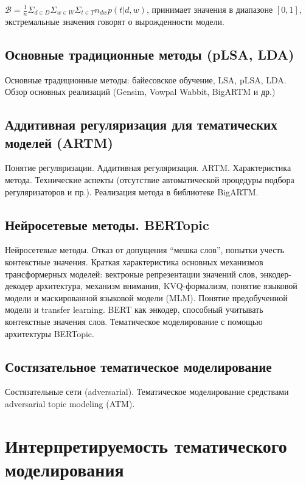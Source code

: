 $\mathcal{B} = \frac{1}{n}\Sigma_{d \in D}\Sigma_{w \in W}\Sigma_{t \in T}n_{dw}p(t|d,w)$, принимает значения в диапазоне $[0, 1]$, экстремальные значения говорят о вырожденности модели.


\section{Основные традиционные методы (pLSA, LDA)}

Основные традиционные методы: байесовское обучение, LSA, pLSA, LDA. Обзор основных реализаций (Gensim, Vowpal Wabbit, BigARTM и др.)

\section{Аддитивная регуляризация для тематических моделей (ARTM)}

Понятие регуляризации. Аддитивная регуляризация. ARTM. Характеристика метода. Технические аспекты (отсутствие автоматической процедуры подбора регуляризаторов и пр.). Реализация метода в библиотеке BigARTM.

\section{Нейросетевые методы. BERTopic}

Нейросетевые методы. Отказ от допущения ``мешка слов'', попытки учесть контекстные значения. Краткая характеристика основных механизмов трансформерных моделей: вектроные репрезентации значений слов, энкодер-декодер архитектура, механизм внимания, KVQ-формализм, понятие языковой модели и маскированной языковой модели (MLM). Понятие предобученной модели и transfer learning. BERT как энкодер, способный учитывать контекстные значения слов. Тематическое моделирование с помощью архитектуры BERTopic.

\section{Состязательное тематическое моделирование}

Состязательные сети (adversarial). Тематическое моделирование средствами adversarial topic modeling (ATM).



\chapter{Интерпретируемость тематического моделирования}

